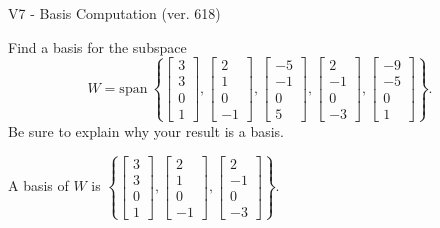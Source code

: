 \begin{exercise}
  \begin{exerciseTitle}V7 - Basis Computation (ver. 618)\end{exerciseTitle}
  \begin{exerciseStatement}
    Find a basis for the subspace 
\[W=\mathrm{span}\ \left\{\left[\begin{array}{r}
3 \\
3 \\
0 \\
1
\end{array}\right] , \left[\begin{array}{r}
2 \\
1 \\
0 \\
-1
\end{array}\right] , \left[\begin{array}{r}
-5 \\
-1 \\
0 \\
5
\end{array}\right] , \left[\begin{array}{r}
2 \\
-1 \\
0 \\
-3
\end{array}\right] , \left[\begin{array}{r}
-9 \\
-5 \\
0 \\
1
\end{array}\right]\right\}.\]
 Be sure to explain why your result is a basis.


  \end{exerciseStatement}
  \begin{exerciseAnswer}
   A basis of \(W\) is  \(\left\{\left[\begin{array}{r}
3 \\
3 \\
0 \\
1
\end{array}\right] , \left[\begin{array}{r}
2 \\
1 \\
0 \\
-1
\end{array}\right] , \left[\begin{array}{r}
2 \\
-1 \\
0 \\
-3
\end{array}\right]\right\}\).
  


  \end{exerciseAnswer}
\end{exercise}
